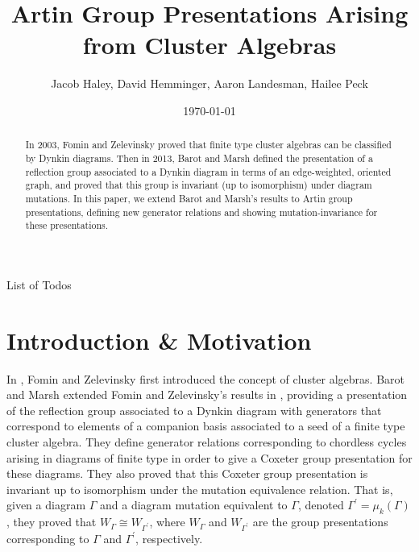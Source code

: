 \documentclass[11pt]{amsart}
\makeatletter
\theoremstyle{definition}
\def\listtodoname{List of Todos}
\def\listoftodos{\@starttoc{tdo}\listtodoname}
\makeatother
\begin{document}
\listoftodos




\title{Artin Group Presentations Arising from Cluster Algebras}
\author{Jacob Haley, David Hemminger, Aaron Landesman, Hailee Peck}
\address{Jacob: University of Notre Dame \\
Hailee: 1184 W Main St; Decatur, IL 62522}
\date{\today}

\begin{abstract}
In 2003, Fomin and Zelevinsky proved that finite type cluster algebras can be classified by Dynkin diagrams. Then in 2013, Barot and Marsh defined the presentation of a reflection group associated to a Dynkin diagram in terms of an edge-weighted, oriented graph, and proved that this group is invariant (up to isomorphism) under diagram mutations. In this paper, we extend Barot and Marsh's results to Artin group presentations, defining new generator relations and showing mutation-invariance for these presentations.
\end{abstract}

\maketitle

\section{Introduction \& Motivation}
\label{sec:Intro}


In \cite{FZ02}, Fomin and Zelevinsky first introduced the concept of cluster algebras. Barot and Marsh extended Fomin and Zelevinsky's results in \cite{BM13}, providing a presentation of the reflection group associated to a Dynkin diagram with generators that correspond to elements of a companion basis associated to a seed of a finite type cluster algebra. They define generator relations corresponding to chordless cycles arising in diagrams of finite type in order to give a Coxeter group presentation for these diagrams. They also proved that this Coxeter group presentation is invariant up to isomorphism under the mutation equivalence relation. That is, given a diagram $\Gamma$ and a diagram mutation equivalent to $\Gamma$, denoted $\Gamma^{\prime} = \mu_k(\Gamma)$, they proved that $W_{\Gamma} \cong W_{\Gamma^{\prime}}$, where $W_{\Gamma}$ and $W_{\Gamma^{\prime}}$ are the group presentations corresponding to $\Gamma$ and $\Gamma^{\prime}$, respectively.
\end{document}

